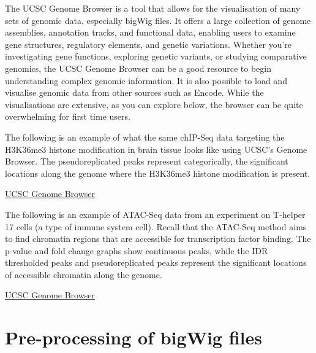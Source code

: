 \documentclass[
]{book}
\begin{document}
The UCSC Genome Browser is a tool that allows for the visualisation of many sets of genomic data, especially bigWig files. It offers a large collection of genome assemblies, annotation tracks, and functional data, enabling users to examine gene structures, regulatory elements, and genetic variations. Whether you're investigating gene functions, exploring genetic variants, or studying comparative genomics, the UCSC Genome Browser can be a good resource to begin understanding complex genomic information. It is also possible to load and visualise genomic data from other sources such as Encode. While the visualisations are extensive, as you can explore below, the browser can be quite overwhelming for first time users.

The following is an example of what the same chIP-Seq data targeting the H3K36me3 histone modification in brain tissue looks like using UCSC's Genome Browser. The pseudoreplicated peaks represent categorically, the significant locations along the genome where the H3K36me3 histone modification is present.

\href{https://genome.ucsc.edu/cgi-bin/hgTracks?db=hg38&lastVirtModeType=default&lastVirtModeExtraState=&virtModeType=default&virtMode=0&nonVirtPosition=&position=chr1\%3A11084744\%2D11095920&hgsid=2307713234_Kap236Tjt6ZGnnNrXMkIhq2Ajn27}{UCSC Genome Browser}

The following is an example of ATAC-Seq data from an experiment on T-helper 17 cells (a type of immune system cell). Recall that the ATAC-Seq method aims to find chromatin regions that are accessible for transcription factor binding. The p-value and fold change graphs show continuous peaks, while the IDR thresholded peaks and pseudoreplicated peaks represent the significant locations of accessible chromatin along the genome.

\href{https://genome.ucsc.edu/cgi-bin/hgTracks?db=hg38&lastVirtModeType=default&lastVirtModeExtraState=&virtModeType=default&virtMode=0&nonVirtPosition=&position=chr1\%3A88379533\%2D113275174&hgsid=2307721306_mcnECXS4Hy0fNQ4yz3ZQTL7nimkW}{UCSC Genome Browser}

\chapter{Pre-processing of bigWig files}\label{pre-processing-of-bigwig-files}
\end{document}

